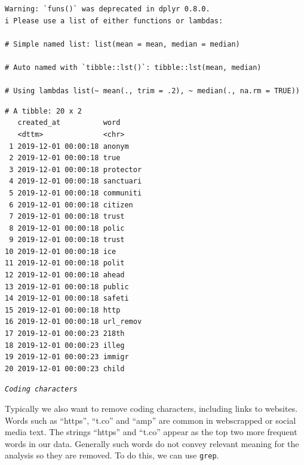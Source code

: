 \documentclass[
  letterpaper,
  DIV=11,
  numbers=noendperiod]{scrreprt}
\newenvironment{Shaded}{\begin{snugshade}}{\end{snugshade}}
\newcommand{\FunctionTok}[1]{\textcolor[rgb]{0.28,0.35,0.67}{#1}}
\newcommand{\NormalTok}[1]{\textcolor[rgb]{0.00,0.23,0.31}{#1}}
\newcommand{\SpecialCharTok}[1]{\textcolor[rgb]{0.37,0.37,0.37}{#1}}
\newcommand{\StringTok}[1]{\textcolor[rgb]{0.13,0.47,0.30}{#1}}
\begin{document}
\begin{verbatim}
Warning: `funs()` was deprecated in dplyr 0.8.0.
i Please use a list of either functions or lambdas:

# Simple named list: list(mean = mean, median = median)

# Auto named with `tibble::lst()`: tibble::lst(mean, median)

# Using lambdas list(~ mean(., trim = .2), ~ median(., na.rm = TRUE))
\end{verbatim}

\begin{verbatim}
# A tibble: 20 x 2
   created_at          word     
   <dttm>              <chr>    
 1 2019-12-01 00:00:18 anonym   
 2 2019-12-01 00:00:18 true     
 3 2019-12-01 00:00:18 protector
 4 2019-12-01 00:00:18 sanctuari
 5 2019-12-01 00:00:18 communiti
 6 2019-12-01 00:00:18 citizen  
 7 2019-12-01 00:00:18 trust    
 8 2019-12-01 00:00:18 polic    
 9 2019-12-01 00:00:18 trust    
10 2019-12-01 00:00:18 ice      
11 2019-12-01 00:00:18 polit    
12 2019-12-01 00:00:18 ahead    
13 2019-12-01 00:00:18 public   
14 2019-12-01 00:00:18 safeti   
15 2019-12-01 00:00:18 http     
16 2019-12-01 00:00:18 url_remov
17 2019-12-01 00:00:23 218th    
18 2019-12-01 00:00:23 illeg    
19 2019-12-01 00:00:23 immigr   
20 2019-12-01 00:00:23 child    
\end{verbatim}

\emph{\texttt{Coding\ characters}}

Typically we also want to remove coding characters, including links to
websites. Words such as ``https'', ``t.co'' and ``amp'' are common in
webscrapped or social media text. The strings ``https'' and ``t.co''
appear as the top two more frequent words in our data. Generally such
words do not convey relevant meaning for the analysis so they are
removed. To do this, we can use \texttt{grep}.

\begin{Shaded}
\end{Shaded}
\end{document}
